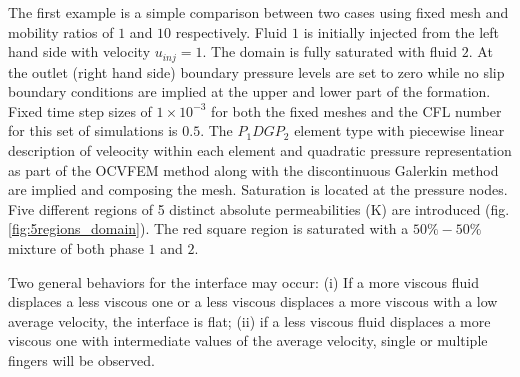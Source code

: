 \documentclass[preprint,authoryear,12pt]{elsarticle}
\begin{document}
\medskip
The first example is a simple comparison between two cases using fixed mesh and mobility ratios of $1$ and $10$ respectively. 
Fluid $1$ is initially injected from the left hand side with velocity $u_{inj}=1$. The domain is fully saturated with fluid $2$. At the outlet (right hand side) boundary pressure levels are set to zero while no slip boundary conditions are implied at the upper and lower part of the formation. Fixed time step sizes of $1 \times 10^{-3}$ for both the fixed meshes and the CFL number for this set of simulations is $0.5$. The $P_{1}DGP_{2}$ element type with piecewise linear description of veleocity within each element and quadratic pressure representation as part of the OCVFEM method along with the discontinuous Galerkin method are implied and composing the mesh. Saturation is located at the pressure nodes. Five different regions of 5 distinct absolute permeabilities (K) are introduced (fig.\ref{fig:5regions_domain}). The red square region is saturated with a $50\%-50\%$ mixture of both phase $1$ and $2$. 

Two general behaviors for the interface may occur: (i) If a more viscous fluid displaces a less viscous one or a less viscous displaces a more viscous with a low average velocity, the interface is flat; (ii) if a less viscous fluid displaces a more viscous one with intermediate values of the average velocity, single or multiple fingers will be observed.
\end{document}
